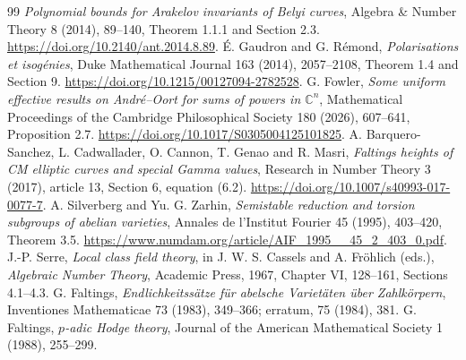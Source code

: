 \documentclass[11pt]{article}
\theoremstyle{definition}
\theoremstyle{remark}
\begin{document}
\begin{thebibliography}{99}
\emph{Polynomial bounds for Arakelov invariants of Belyi curves},
Algebra \& Number Theory 8 (2014), 89--140,
Theorem 1.1.1 and Section 2.3.
\url{https://doi.org/10.2140/ant.2014.8.89}.
 \'E. Gaudron and G. R\'emond,
\emph{Polarisations et isog\'enies}, Duke Mathematical Journal
163 (2014), 2057--2108, Theorem 1.4 and Section 9.
\url{https://doi.org/10.1215/00127094-2782528}.
 G. Fowler, \emph{Some uniform effective results on
Andr\'e--Oort for sums of powers in $\mathbb C^n$}, Mathematical
Proceedings of the Cambridge Philosophical Society 180 (2026),
607--641, Proposition 2.7.
\url{https://doi.org/10.1017/S0305004125101825}.
 A. Barquero-Sanchez, L. Cadwallader, O. Cannon,
T. Genao and R. Masri, \emph{Faltings heights of CM elliptic curves
and special Gamma values}, Research in Number Theory 3 (2017),
article 13, Section 6, equation (6.2).
\url{https://doi.org/10.1007/s40993-017-0077-7}.
 A. Silverberg and Yu. G. Zarhin,
\emph{Semistable reduction and torsion subgroups of abelian varieties},
Annales de l'Institut Fourier 45 (1995), 403--420, Theorem 3.5.
\url{https://www.numdam.org/article/AIF_1995__45_2_403_0.pdf}.
 J.-P. Serre, \emph{Local class field theory},
in J. W. S. Cassels and A. Fr\"ohlich (eds.), \emph{Algebraic Number Theory},
Academic Press, 1967, Chapter VI, 128--161, Sections 4.1--4.3.
 G. Faltings, \emph{Endlichkeitss\"atze f\"ur
abelsche Variet\"aten \"uber Zahlk\"orpern}, Inventiones Mathematicae
73 (1983), 349--366; erratum, 75 (1984), 381.
 G. Faltings, \emph{$p$-adic Hodge theory},
Journal of the American Mathematical Society 1 (1988), 255--299.


\end{thebibliography}
\end{document}
